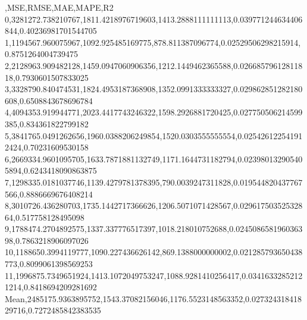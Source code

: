 ,MSE,RMSE,MAE,MAPE,R2
0,3281272.738210767,1811.4218976719603,1413.2888111111113,0.039771244634406844,0.40236981701544705
1,1194567.960075967,1092.925485169775,878.811387096774,0.02529506298215914,0.8751264004739475
2,2128963.909482128,1459.0947060906356,1212.1449462365588,0.02668579612811818,0.7930601507833025
3,3328790.840474531,1824.4953187368908,1352.0991333333327,0.029862851282180608,0.6508843678696784
4,4094353.919944771,2023.4417743246322,1598.2926881720425,0.027750506214599385,0.834361822799182
5,3841765.0491262656,1960.0388206249854,1520.0303555555554,0.025426122541912424,0.70231609530158
6,2669334.9601095705,1633.7871881132749,1171.1644731182794,0.023980132905405894,0.6243418090863875
7,1298335.0181037746,1139.4279781378395,790.0039247311828,0.019544820437767566,0.8886669676408214
8,3010726.436280703,1735.1442717366626,1206.5071071428567,0.02961750352532864,0.517758128495098
9,1788474.2704892575,1337.337776517397,1018.218010752688,0.024508658196036398,0.7863218906097026
10,1188650.3994119777,1090.227436626142,869.1388000000002,0.021285793650438773,0.8099061398569253
11,1996875.7349651924,1413.1072049753247,1088.9281410256417,0.03416332852121214,0.8418694209281692
Mean,2485175.9363895752,1543.37082156046,1176.5523148563352,0.02732431841829716,0.7272485842383535
